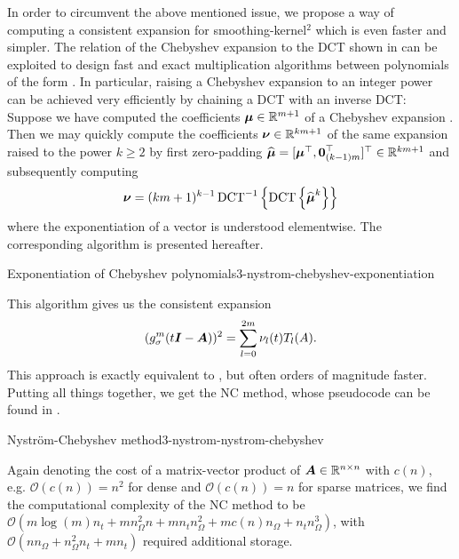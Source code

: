 In order to circumvent the above mentioned issue, we propose a way of computing
a consistent expansion for \gls{smoothing-kernel}$^2$ which is even faster and simpler.
The relation of the Chebyshev expansion to the \gls{DCT} shown in 
can be exploited to design fast and exact multiplication algorithms between polynomials
of the form  \cite[proposition~3.1]{baszenski1997cosine}.
In particular, raising a Chebyshev expansion to an integer power can be achieved
very efficiently by chaining a \gls{DCT} with an inverse \gls{DCT}:
Suppose we have computed the coefficients $\boldsymbol{\mu} \in \mathbb{R}^{m+1}$
of a Chebyshev expansion .
Then we may quickly compute the coefficients $\boldsymbol{\nu} \in \mathbb{R}^{km+1}$
of the same expansion raised to the power $k \geq 2$ by first zero-padding
$\widehat{\boldsymbol{\mu}} = [\boldsymbol{\mu}^{\top}, \boldsymbol{0}_{(k-1)m}^{\top}]^{\top} \in \mathbb{R}^{km+1}$
and subsequently computing
\begin{equation}
    \boldsymbol{\nu} = (km + 1)^{k - 1} \operatorname{DCT}^{-1}\left\{ \operatorname{DCT}\left\{\widehat{\boldsymbol{\mu}}^{k}\right\} \right\}
    \label{equ:3-nystrom-chebyshev-potentiate-coefficients}
\end{equation}
where the exponentiation of a vector is understood elementwise.
The corresponding algorithm is presented hereafter.
\begin{algo}{Exponentiation of Chebyshev polynomials}{3-nystrom-chebyshev-exponentiation}
    
\end{algo}
This algorithm gives us the consistent expansion
\begin{equation}
    (g_{\sigma}^m(t\boldsymbol{I} - \boldsymbol{A}))^2 = \sum_{l=0}^{2m} \nu_l(t) T_l(A).
    \label{equ:3-nystrom-consistent-chebyshev-expansion}
\end{equation}
This approach is exactly equivalent to \cite[algorithm~5]{lin2017randomized}, but
often orders of magnitude faster.\\

Putting all things together, we get the \gls{NC} method, whose pseudocode
can be found in .
\begin{algo}{Nystr\"om-Chebyshev method}{3-nystrom-nystrom-chebyshev}
    
\end{algo}

Again denoting the cost of a matrix-vector product of $\boldsymbol{A} \in \mathbb{R}^{n \times n}$
with $c(n)$, e.g. $\mathcal{O}(c(n)) = n^2$ for dense and $\mathcal{O}(c(n)) = n$
for sparse matrices, we find the computational complexity of the \gls{NC}
method to be $\mathcal{O}(m \log(m) n_t + m n_{\Omega}^2 n + m n_t n_{\Omega}^2 +  m c(n) n_{\Omega} + n_t n_{\Omega}^3)$, with
$\mathcal{O}(n n_{\Omega} + n_{\Omega}^2 n_t + m n_t)$ required additional storage.

